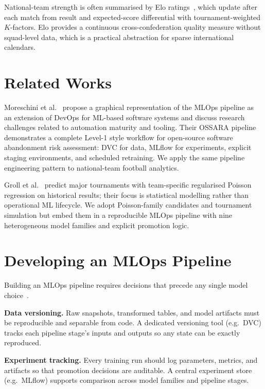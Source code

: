 \documentclass[conference]{IEEEtran}
\begin{document}
National-team strength is often summarised by Elo ratings~\cite{eloratings},
which update after each match from result and expected-score differential with
tournament-weighted $K$-factors.
Elo provides a continuous cross-confederation quality measure without squad-level
data, which is a practical abstraction for sparse international calendars.

\section{Related Works}
\label{sec:related}

Moreschini et al.~\cite{moreschini2022mlops} propose a graphical representation 
of the MLOps pipeline as an extension of DevOps for ML-based software systems and 
discuss research challenges related to automation maturity and tooling.
Their OSSARA pipeline~\cite{ossara2023} demonstrates a complete Level-1 style
workflow for open-source software abandonment risk assessment: DVC for data, 
MLflow for experiments, explicit staging environments, and scheduled 
retraining. 
We apply the same pipeline engineering pattern to national-team football analytics.

Groll et al.~\cite{groll2019prediction} predict major tournaments with
team-specific regularised Poisson regression on historical results; their focus
is statistical modelling rather than operational ML lifecycle.
We adopt Poisson-family candidates and tournament simulation but embed them in
a reproducible MLOps pipeline with nine heterogeneous model families and
explicit promotion logic.


\section{Developing an MLOps Pipeline}
\label{sec:developing}

Building an MLOps pipeline requires decisions that precede any single model
choice~\cite{google_mlops,databricks_bigbook}.

\textbf{Data versioning.}
Raw snapshots, transformed tables, and model artifacts must be reproducible 
and separable from code. A dedicated versioning tool (e.g.\ DVC) tracks each 
pipeline stage's inputs and outputs so any state can be exactly reproduced.

\textbf{Experiment tracking.}
Every training run should log parameters, metrics, and artifacts so that
promotion decisions are auditable.
A central experiment store (e.g.\ MLflow) supports comparison across model
families and pipeline stages.
\end{document}
